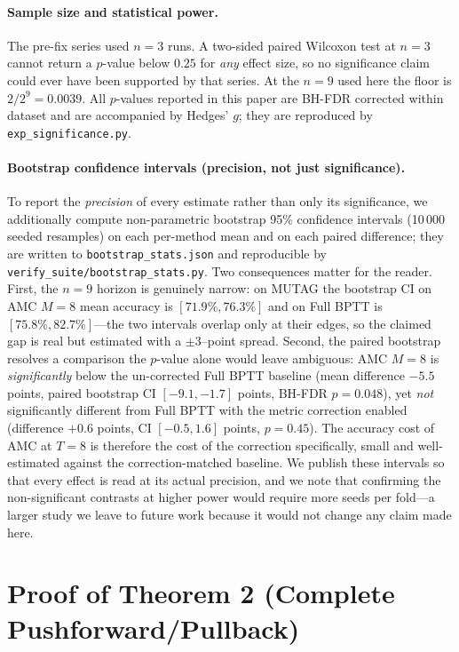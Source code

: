\documentclass[a4paper,fleqn]{cas-dc}
\begin{document}
\paragraph{Sample size and statistical power.}
The pre-fix series used $n{=}3$ runs. A two-sided paired Wilcoxon test
at $n{=}3$ cannot return a $p$-value below $0.25$ for \emph{any} effect
size, so no significance claim could ever have been supported by that
series. At the $n{=}9$ used here the floor is $2/2^{9}=0.0039$. All
$p$-values reported in this paper are BH-FDR corrected within dataset
and are accompanied by Hedges' $g$; they are reproduced by
\texttt{exp\_significance.py}.

\paragraph{Bootstrap confidence intervals (precision, not just significance).}
To report the \emph{precision} of every estimate rather than only its
significance, we additionally compute non-parametric bootstrap 95\% confidence
intervals (10\,000 seeded resamples) on each per-method mean and on each paired
difference; they are written to \texttt{bootstrap\_stats.json} and reproducible
by \texttt{verify\_suite/bootstrap\_stats.py}. Two consequences matter for the
reader. First, the $n{=}9$ horizon is genuinely narrow: on MUTAG the bootstrap
CI on AMC $M{=}8$ mean accuracy is $[71.9\%,76.3\%]$ and on Full BPTT is
$[75.8\%,82.7\%]$---the two intervals overlap only at their edges, so the
claimed gap is real but estimated with a $\pm3$--point spread. Second, the
paired bootstrap resolves a comparison the $p$-value alone would leave ambiguous:
AMC $M{=}8$ is \emph{significantly} below the un-corrected Full BPTT baseline
(mean difference $-5.5$ points, paired bootstrap CI $[-9.1,-1.7]$ points,
BH-FDR $p{=}0.048$), yet \emph{not} significantly different from Full BPTT with
the metric correction enabled (difference $+0.6$ points, CI $[-0.5,1.6]$ points,
$p{=}0.45$). The accuracy cost of AMC at $T{=}8$ is therefore the cost of the
correction specifically, small and well-estimated against the correction-matched
baseline. We publish these intervals so that every effect is read at its actual
precision, and we note that confirming the non-significant contrasts at higher
power would require more seeds per fold---a larger study we leave to future work
because it would not change any claim made here.

\section{Proof of Theorem 2 (Complete Pushforward/Pullback)}
\label{sec:theorem_proof}
\end{document}
